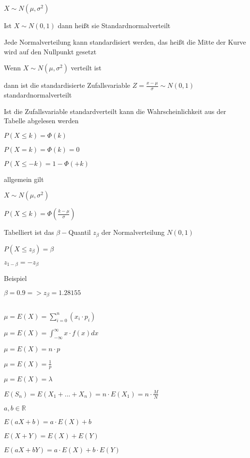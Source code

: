 \documentclass[10pt,a4paper,landscape]{article}
\begin{document}
\begin{multicols*}{4}
\subsection{}
\parbox{\columnwidth}{\centering $X \sim N(\mu, \sigma^2)$}
\parbox{\columnwidth}{\centering Ist $X \sim N(0, 1)$ dann heißt sie Standardnormalverteilt}
\parbox{\columnwidth}{\centering Jede Normalverteilung kann standardisiert werden, das heißt die Mitte der Kurve wird auf den Nullpunkt gesetzt}
\parbox{\columnwidth}{\centering Wenn $X \sim N(\mu, \sigma^2)$ verteilt ist}
\parbox{\columnwidth}{\centering dann ist die standardisierte Zufallsvariable $Z = \frac{x-\mu}{\sigma} \sim N(0,1)$ standardnormalverteilt}
\parbox{\columnwidth}{\centering Ist die Zufallsvariable standardverteilt kann die Wahrscheinlichkeit aus der Tabelle abgelesen werden}
\parbox{\columnwidth}{\centering $P(X \leq k) = \Phi(k)$}
\parbox{\columnwidth}{\centering $P(X = k) = \Phi(k) = 0$}
\parbox{\columnwidth}{\centering $P(X \leq -k) = 1 - \Phi(+k)$}
\parbox{\columnwidth}{\centering allgemein gilt}
\parbox{\columnwidth}{\centering $X \sim N (\mu, \sigma^2)$}
\parbox{\columnwidth}{\centering $P(X \leq k) = \Phi(\frac{k-\mu}{\sigma})$}
\parbox{\columnwidth}{\centering Tabelliert ist das $\beta-$Quantil $z_\beta$ der Normalverteilung $N(0,1)$}
\parbox{\columnwidth}{\centering $P(X \leq z_\beta) = \beta$}
\parbox{\columnwidth}{\centering $z_{1-\beta} = -z_\beta$}
\parbox{\columnwidth}{\centering Beispiel}
\parbox{\columnwidth}{\centering $\beta = 0.9 => z_\beta = 1.28155$}
\subsection{}
\subsubsection{}
\parbox{\columnwidth}{\centering $\mu = E(X) = \sum \limits_{i=0}^n (x_i \cdot p_i)$}
\parbox{\columnwidth}{\centering $\mu = E(X) = \int_{-\infty}^{\infty} x \cdot f(x) dx $}
\parbox{\columnwidth}{\centering $\mu = E(X) = n \cdot p$}
\parbox{\columnwidth}{\centering $\mu = E(X) = \frac{1}{p}$}
\parbox{\columnwidth}{\centering $\mu = E(X) = \lambda$}
\parbox{\columnwidth}{\centering $E(S_n) = E(X_1 + ... + X_n) = n \cdot E(X_1) = n \cdot \frac{M}{N}$}
\parbox{\columnwidth}{\centering $a, b \in \mathbb{R}$}
\parbox{\columnwidth}{\centering $E(aX + b) = a \cdot E(X) + b$}
\parbox{\columnwidth}{\centering $E(X + Y) = E(X) + E(Y)$}
\parbox{\columnwidth}{\centering $E(aX + bY) = a \cdot E(X) + b \cdot E(Y)$}

\end{multicols*}
\end{document}
